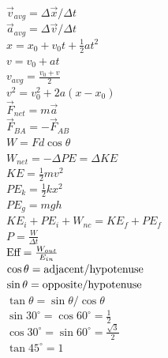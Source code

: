 \documentclass[letterpaper,addpoints,answers]{exam}
\begin{document}

 \fontseries{\seriesdefault}
 \begin{multicols}{2}
 \Large
 \noindent
 $\vec{v}_{avg} = \Delta\vec{x} / \Delta t$ \\
 $\vec{a}_{avg} = \Delta\vec{v} / \Delta t$ \\
 $x = x_0 + v_0 t + \frac{1}{2} a t^2$ \\
 $v = v_0 + a t$ \\
 $v_{avg} = \frac{v_0 + v}{2}$ \\
 $v^2 = v_0^2 + 2 a (x - x_0)$ \\
 $\vec{F}_{net} = m \vec{a}$ \\
 $\vec{F}_{BA} = - \vec{F}_{AB}$ \\
 $W = F d \cos\theta$ \\
 $W_{net} = -\Delta PE = \Delta KE$ \\
 $KE = \frac{1}{2} m v^2$ \\
 $PE_k = \frac{1}{2} k x^2$ \\
 $PE_g = m g h$ \\
 $KE_i + PE_i + W_{nc} = KE_f + PE_f$ \\
 $P = \frac{W}{\Delta t}$ \\
 $\hbox{Eff} = \frac{W_{out}}{E_{in}}$ \\
 $\cos\theta = \hbox{adjacent}/\hbox{hypotenuse}$ \\
 $\sin\theta = \hbox{opposite}/\hbox{hypotenuse}$ \\
 $\tan\theta = \sin\theta / \cos\theta$ \\
 $\sin 30^\circ = \cos 60^\circ = \frac{1}{2}$ \\
 $\cos 30^\circ = \sin 60^\circ = \frac{\sqrt{3}}{2}$ \\
 $\tan 45^\circ = 1$ \\


\end{multicols}
\end{document}
